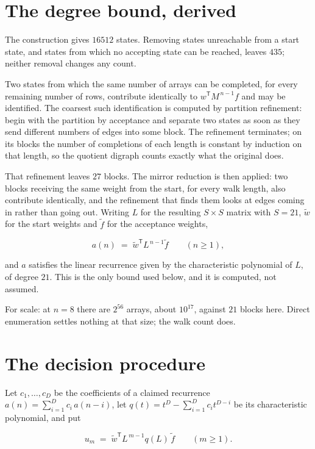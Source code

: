 \documentclass[11pt]{article}
\theoremstyle{definition}
\begin{document}
\section{The degree bound, derived}

The construction gives $16512$ states. Removing states unreachable from a start state, and states from which no accepting state can be reached, leaves $435$; neither removal changes any count.

Two states from which the same number of arrays can be completed, for every remaining number of rows, contribute identically to $w^{\mathsf T}M^{\,n-1}f$ and may be identified. The coarsest such identification is computed by partition refinement: begin with the partition by acceptance and separate two states as soon as they send different numbers of edges into some block. The refinement terminates; on its blocks the number of completions of each length is constant by induction on that length, so the quotient digraph counts exactly what the original does.

That refinement leaves $27$ blocks. The mirror reduction is then applied: two blocks receiving the same weight from the start, for every walk length, also contribute identically, and the refinement that finds them looks at edges coming in rather than going out. Writing $L$ for the resulting $S \times S$ matrix with $S = 21$, $\tilde w$ for the start weights and $\tilde f$ for the acceptance weights,

\[a(n) \;=\; \tilde w^{\mathsf T} L^{\,n-1} \tilde f \qquad (n \ge 1),\]

and $a$ satisfies the linear recurrence given by the characteristic polynomial of $L$, of degree $21$. This is the only bound used below, and it is computed, not assumed.

For scale: at $n = 8$ there are $2^{56}$ arrays, about $10^{17}$, against $21$ blocks here. Direct enumeration settles nothing at that size; the walk count does.

\section{The decision procedure}

Let $c_1,\dots,c_D$ be the coefficients of a claimed recurrence $a(n) = \sum_{i=1}^{D} c_i\,a(n-i)$, let $q(t) = t^{D} - \sum_{i=1}^{D} c_i t^{D-i}$ be its characteristic polynomial, and put

\[u_m \;=\; \tilde w^{\mathsf T} L^{\,m-1} q(L)\,\tilde f \qquad (m \ge 1).\]
\end{document}
